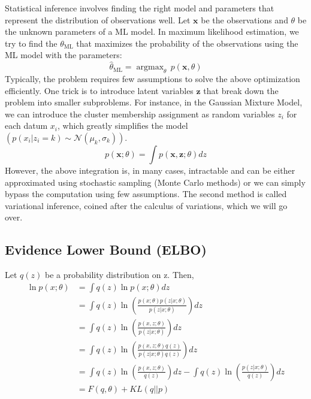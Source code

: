 \documentclass{article}
\DeclareMathOperator*{\argmax}{argmax}
\begin{document}
Statistical inference involves finding the right model and parameters that represent the distribution of observations well. Let $\mathbf{x}$ be the observations and $\theta$ be the unknown parameters of a ML model. In maximum likelihood estimation, we try to find the $\theta_\mathrm{ML}$
that maximizes the probability of the observations using the ML model with the parameters:
\begin{equation}
\hat{\theta}_\mathrm{ML} = \argmax_\theta \, p(\mathbf{x}, \theta)
\end{equation}
Typically, the problem requires few assumptions to solve the above optimization efficiently. One trick is to introduce latent variables $\mathbf{z}$ that break down the problem into smaller subproblems. For instance, in the Gaussian Mixture Model, we can introduce the cluster membership assignment as random variables $z_i$ for each datum $x_i$, which greatly simplifies the model
$(p(x_i|z_i=k) \sim \mathcal{N}(\mu_k,\sigma_k))$.
\begin{equation}
p(\mathbf{x};\theta)=\int p(\mathbf{x},\mathbf{z};\theta) d{z}
\end{equation}
However, the above integration is, in many cases, intractable and can be either approximated using stochastic sampling (Monte Carlo methods) or we can simply bypass the computation using few assumptions. The second method is called variational inference, coined after the calculus of variations, which we will go over.

\subsection{Evidence Lower Bound (ELBO)}

Let $q(z)$ be a probability distribution on z. Then,
\begin{align}
\ln p(x;\theta) &= \int q(z) \ln p(x; \theta) dz \nonumber \\
&= \int q(z) \ln \left( \frac{p(x; \theta) p(z|x; \theta)}{p(z|x; \theta)} \right) dz \nonumber \\
&= \int q(z) \ln \left( \frac{p(x,z; \theta)}{p(z|x; \theta)} \right) dz \nonumber \\
&= \int q(z) \ln \left( \frac{p(x,z; \theta)q(z)}{p(z|x; \theta)q(z)} \right) dz \nonumber \\
&= \int q(z) \ln \left( \frac{p(x,z; \theta)}{q(z)} \right) dz - \int q(z) \ln \left( \frac{p(z|x; \theta)}{q(z)} \right) dz \nonumber \\
&= F(q,\theta) + KL(q||p) \nonumber 
\end{align}
\end{document}
